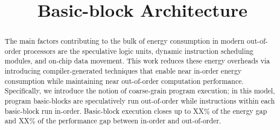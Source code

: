 \documentclass[pageno]{jpaper}
\begin{document}
\title{
Basic-block Architecture}

\date{}
\maketitle


\begin{abstract}

The main factors contributing to the bulk of energy consumption in modern
out-of-order processors are the speculative logic units, dynamic instruction
scheduling modules, and on-chip data movement.  This work reduces
these energy overheads via introducing compiler-generated techniques that enable
near in-order energy consumption while maintaining near out-of-order computation
performance. Specifically, we introduce the notion of coarse-grain program
execution; in this model, program basic-blocks are speculatively run
out-of-order while instructions within each basic-block run in-order.
Basic-block execution closes up to XX\% of the energy gap and XX\% of the
performance gap between in-order and out-of-order.

\end{abstract}







%


%



\end{document}
